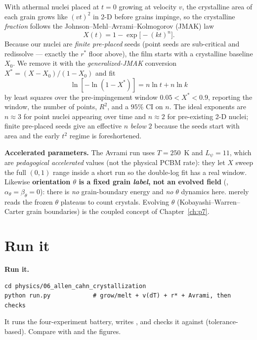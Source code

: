 With athermal nuclei placed at $t=0$ growing at velocity $v$, the
crystalline area of each grain grows like $(vt)^2$ in 2-D before grains
impinge, so the crystalline \emph{fraction} follows the
Johnson--Mehl--Avrami--Kolmogorov (JMAK) law
%
\begin{equation}
  X(t) = 1 - \exp\!\big[-(kt)^n\big].
\end{equation}
%
Because our nuclei are \emph{finite pre-placed} seeds (point seeds are
sub-critical and redissolve --- exactly the $r^\ast$ floor above), the
film starts with a crystalline baseline $X_0$. We remove it with the
\emph{generalized-JMAK} conversion $X^\ast=(X-X_0)/(1-X_0)$ and fit
%
\begin{equation}
  \ln[-\ln(1-X^\ast)] = n\ln t + n\ln k
\end{equation}
%
by least squares over the pre-impingement window
$\ensuremath{0.05}<X^\ast<\ensuremath{0.9}$, reporting the window, the
number of points, $R^2$, and a $95\%$ CI on $n$. The ideal exponents are
$n\approx3$ for point nuclei appearing over time and $n\approx2$ for
pre-existing 2-D nuclei; finite pre-placed seeds give an effective $n$
\emph{below} $2$ because the seeds start with area and the early $t^2$
regime is foreshortened.

\begin{keybox}
\textbf{Accelerated parameters.} The Avrami run uses $T=250$~K and
$L_\psi=11$, which are \emph{pedagogical accelerated} values (not the
physical PCBM rate): they let $X$ sweep the full $(0,1)$ range inside a
short run so the double-log fit has a real window. Likewise
\textbf{orientation $\theta$ is a fixed grain \emph{label}, not an evolved
field} (, $\alpha_\theta=\beta_\theta=0$): there
is \emph{no} grain-boundary energy and \emph{no} $\theta$ dynamics here.
 merely reads the frozen $\theta$ plateaus to count
crystals. Evolving $\theta$ (Kobayashi--Warren--Carter grain boundaries) is
the coupled concept of Chapter~\ref{ch:p7}.
\end{keybox}

\section{Run it}

\begin{runbox}
\textbf{Run it.}
\begin{lstlisting}
cd physics/06_allen_cahn_crystallization
python run.py            # grow/melt + v(dT) + r* + Avrami, then checks
\end{lstlisting}
It runs the four-experiment battery, writes ,
and checks it against  (tolerance-based). Compare with
 and the figures.
\end{runbox}


